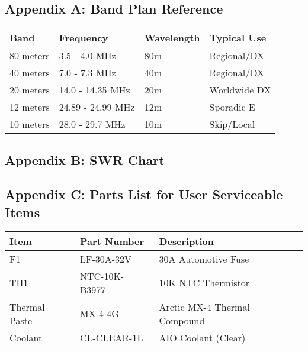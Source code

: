 \documentclass[11pt,a4paper]{article}
\begin{document}
\subsection{Appendix A: Band Plan Reference}
\begin{center}
\small
\begin{tabular}{|l|l|l|l|}
\hline
\textbf{Band} & \textbf{Frequency} & \textbf{Wavelength} & \textbf{Typical Use} \\
\hline
80 meters & 3.5 - 4.0 MHz & 80m & Regional/DX \\
40 meters & 7.0 - 7.3 MHz & 40m & Regional/DX \\
20 meters & 14.0 - 14.35 MHz & 20m & Worldwide DX \\
12 meters & 24.89 - 24.99 MHz & 12m & Sporadic E \\
10 meters & 28.0 - 29.7 MHz & 10m & Skip/Local \\
\hline
\end{tabular}
\end{center}

\subsection{Appendix B: SWR Chart}
\begin{center}
\end{center}

\subsection{Appendix C: Parts List for User Serviceable Items}
\begin{center}
\begin{tabular}{|l|l|l|}
\hline
\textbf{Item} & \textbf{Part Number} & \textbf{Description} \\
\hline
F1 & LF-30A-32V & 30A Automotive Fuse \\
TH1 & NTC-10K-B3977 & 10K NTC Thermistor \\
Thermal Paste & MX-4-4G & Arctic MX-4 Thermal Compound \\
Coolant & CL-CLEAR-1L & AIO Coolant (Clear) \\
\hline
\end{tabular}
\end{center}
\end{document}
